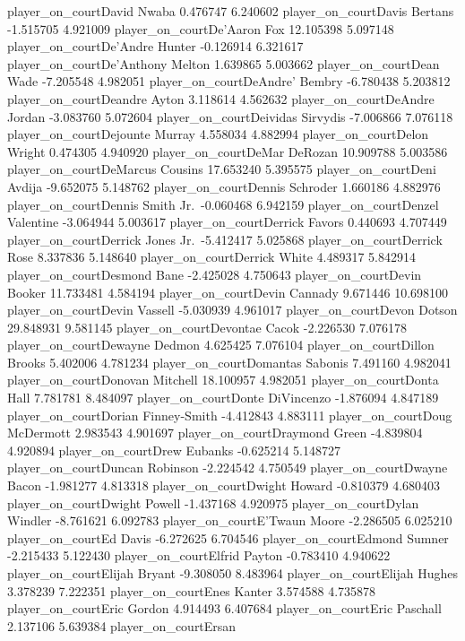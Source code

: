 \documentclass[
  landscape]{article}
\begin{document}
player\_on\_courtDavid Nwaba 0.476747 6.240602 player\_on\_courtDavis
Bertans -1.515705 4.921009 player\_on\_courtDe'Aaron Fox 12.105398
5.097148 player\_on\_courtDe'Andre Hunter -0.126914 6.321617
player\_on\_courtDe'Anthony Melton 1.639865 5.003662
player\_on\_courtDean Wade -7.205548 4.982051 player\_on\_courtDeAndre'
Bembry -6.780438 5.203812 player\_on\_courtDeandre Ayton 3.118614
4.562632 player\_on\_courtDeAndre Jordan -3.083760 5.072604
player\_on\_courtDeividas Sirvydis -7.006866 7.076118
player\_on\_courtDejounte Murray 4.558034 4.882994
player\_on\_courtDelon Wright 0.474305 4.940920 player\_on\_courtDeMar
DeRozan 10.909788 5.003586 player\_on\_courtDeMarcus Cousins 17.653240
5.395575 player\_on\_courtDeni Avdija -9.652075 5.148762
player\_on\_courtDennis Schroder 1.660186 4.882976
player\_on\_courtDennis Smith Jr.~-0.060468 6.942159
player\_on\_courtDenzel Valentine -3.064944 5.003617
player\_on\_courtDerrick Favors 0.440693 4.707449
player\_on\_courtDerrick Jones Jr.~-5.412417 5.025868
player\_on\_courtDerrick Rose 8.337836 5.148640 player\_on\_courtDerrick
White 4.489317 5.842914 player\_on\_courtDesmond Bane -2.425028 4.750643
player\_on\_courtDevin Booker 11.733481 4.584194 player\_on\_courtDevin
Cannady 9.671446 10.698100 player\_on\_courtDevin Vassell -5.030939
4.961017 player\_on\_courtDevon Dotson 29.848931 9.581145
player\_on\_courtDevontae Cacok -2.226530 7.076178
player\_on\_courtDewayne Dedmon 4.625425 7.076104
player\_on\_courtDillon Brooks 5.402006 4.781234
player\_on\_courtDomantas Sabonis 7.491160 4.982041
player\_on\_courtDonovan Mitchell 18.100957 4.982051
player\_on\_courtDonta Hall 7.781781 8.484097 player\_on\_courtDonte
DiVincenzo -1.876094 4.847189 player\_on\_courtDorian Finney-Smith
-4.412843 4.883111 player\_on\_courtDoug McDermott 2.983543 4.901697
player\_on\_courtDraymond Green -4.839804 4.920894 player\_on\_courtDrew
Eubanks -0.625214 5.148727 player\_on\_courtDuncan Robinson -2.224542
4.750549 player\_on\_courtDwayne Bacon -1.981277 4.813318
player\_on\_courtDwight Howard -0.810379 4.680403
player\_on\_courtDwight Powell -1.437168 4.920975 player\_on\_courtDylan
Windler -8.761621 6.092783 player\_on\_courtE'Twaun Moore -2.286505
6.025210 player\_on\_courtEd Davis -6.272625 6.704546
player\_on\_courtEdmond Sumner -2.215433 5.122430
player\_on\_courtElfrid Payton -0.783410 4.940622
player\_on\_courtElijah Bryant -9.308050 8.483964
player\_on\_courtElijah Hughes 3.378239 7.222351 player\_on\_courtEnes
Kanter 3.574588 4.735878 player\_on\_courtEric Gordon 4.914493 6.407684
player\_on\_courtEric Paschall 2.137106 5.639384 player\_on\_courtErsan
\end{document}
